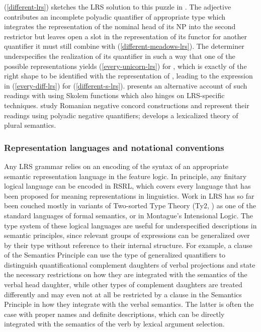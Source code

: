 \documentclass[output=paper]{langsci/langscibook}
\begin{document}
(\ref{different-lrs}) sketches the LRS solution to this puzzle in
\citet{Richter2016}. The
adjective  contributes an incomplete polyadic
quantifier of appropriate type which integrates the representation of
the nominal head of its NP into the second restrictor but leaves open
a slot in the representation of its functor for another quantifier it
must still combine with (\ref{different-meadows-lrs}). The determiner
 underspecifies the realization of its quantifier in such
a way that one of the possible representations yields
(\ref{every-unicorn-lrs}) for , which is exactly
of the right shape to be identified with the representation of
, leading to the expression in
(\ref{every-diff-lrs}) for (\ref{different-s-lrs}).
\citet{Lahm2016b} presents an alternative account of such readings
with  using Skolem functions which also hinges on
LRS-specific techniques. \citet{IordachioaiaandRichter2015} study Romanian
negative concord constructions and represent their readings using polyadic negative
quantifiers; \citet{Lahm2018} develops a lexicalized theory
of plural semantics.




\subsubsection{Representation languages and notational conventions}

Any LRS grammar relies on an encoding of the syntax of an appropriate semantic representation language in the feature logic. In principle, any finitary logical language can be encoded in RSRL, which covers every language that has been proposed for meaning representations in linguistics. Work in LRS has so far been couched mostly in variants of Two-sorted Type Theory (Ty2, \citealt{Gallin1975}) as one of the standard languages of formal semantics, or in Montague's Intensional Logic. The type system of these logical languages are useful for underspecified descriptions in semantic principles, since relevant groups of expressions can be generalized over by their type without reference to their internal structure. For example, a clause of the Semantics Principle can use the type of generalized quantifiers to distinguish quantificational complement daughters of verbal projections and state the necessary restrictions on how they are integrated with the semantics of the verbal head daughter, while other types of complement daughters are treated differently and may even not at all be restricted by a clause in the Semantics Principle in how they integrate with the verbal semantics. The latter is often the case with proper names and definite descriptions, which can be directly integrated with the semantics of the verb by lexical argument selection.
\end{document}
